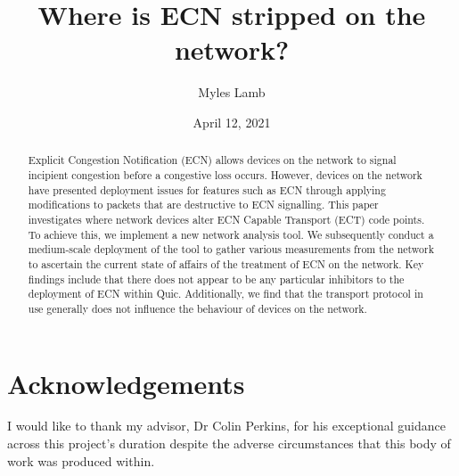 \documentclass{l4proj}
\begin{document}
\title{Where is ECN stripped on the network?}
\author{Myles Lamb}
\date{April 12, 2021}

\maketitle

\begin{abstract}
    
 Explicit Congestion Notification (ECN) allows devices on the network to signal incipient congestion before a congestive loss occurs. However, devices on the network have presented deployment issues for features such as ECN through applying modifications to packets that are destructive to ECN signalling. This paper investigates where network devices alter ECN Capable Transport (ECT) code points. To achieve this, we implement a new network analysis tool. We subsequently conduct a medium-scale deployment of the tool to gather various measurements from the network to ascertain the current state of affairs of the treatment of ECN on the network. Key findings include that there does not appear to be any particular inhibitors to the deployment of ECN within Quic. Additionally, we find that the transport protocol in use generally does not influence the behaviour of devices on the network.
    
\end{abstract}

\chapter*{Acknowledgements}

I would like to thank my advisor, Dr Colin Perkins, for his exceptional guidance across this project's duration despite the adverse circumstances that this body of work was produced within.


\def\consentname {Myles Lamb} %
\def\consentdate {April 12 2021} %

\educationalconsent


\tableofcontents
\end{document}
